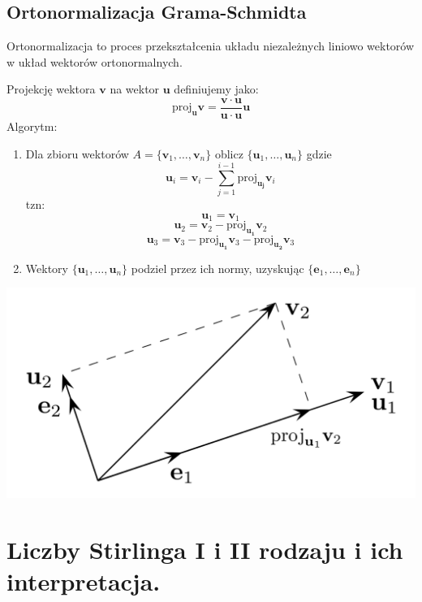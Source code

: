 \documentclass[12pt]{article}
\begin{document}
    \newpage
    \subsection{Ortonormalizacja Grama-Schmidta}

    Ortonormalizacja to proces przekształcenia układu niezależnych liniowo wektorów w układ wektorów ortonormalnych.

    Projekcję wektora $\mathbf{v}$ na wektor $\mathbf{u}$ definiujemy jako:
    \[\mathrm{proj}_\mathbf{u} \mathbf{v} = \frac{\mathbf{v} \cdot \mathbf{u}}{\mathbf{u} \cdot \mathbf{u}} \mathbf{u}\]
    Algorytm:

    \begin{enumerate}

        \item Dla zbioru wektorów $A = \{\mathbf{v}_1, \dots,  \mathbf{v}_n\}$ oblicz $\{{\mathbf{u}_1, \ldots, \mathbf{u}_n}\}$ gdzie \[\mathbf{u}_i = \mathbf{v}_i - \sum_{j=1}^{i-1} \mathrm{proj}_\mathbf{u_j} \mathbf{v}_i\]
        tzn:
        \[\mathbf{u}_1 = \mathbf{v}_1\]
        \[\mathbf{u}_2 = \mathbf{v}_2 - \mathrm{proj}_\mathbf{u_1} \mathbf{v}_2\]
        \[\mathbf{u}_3 = \mathbf{v}_3 - \mathrm{proj}_\mathbf{u_1} \mathbf{v}_3 - \mathrm{proj}_\mathbf{u_2} \mathbf{v}_3\]

        \item Wektory $\{{\mathbf{u}_1, \ldots, \mathbf{u}_n}\}$ podziel przez ich normy, uzyskując $\{{\mathbf{e}_1, \ldots, \mathbf{e}_n}\}$

    \end{enumerate}

    \includegraphics[scale=0.20]{15_6.png}

    \newpage

    \section{Liczby Stirlinga I i II rodzaju i ich interpretacja.}
\end{document}
